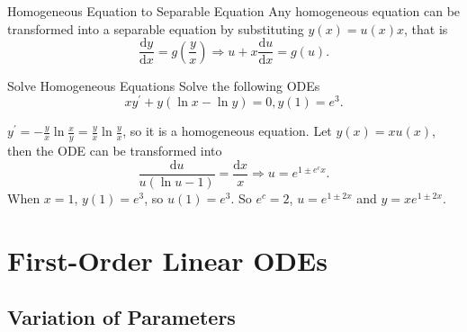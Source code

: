 \begin{proposition}{Homogeneous Equation to Separable Equation}{}
  Any homogeneous equation can be transformed into a separable equation
  by substituting $y(x) = u(x)x$, that is
  \begin{equation}
    \frac{\mathrm{d} y}{\mathrm{d} x} = g \left( \frac{y}{x} \right)
    \Rightarrow
    u + x \frac{\mathrm{d}u}{\mathrm{d} x} = g(u).
  \end{equation}
\end{proposition}

\begin{example}{Solve Homogeneous Equations}{}
  Solve the following ODEs
  \begin{equation}
    xy^{\prime} + y(\ln x - \ln y) = 0, y(1) = e^3.
  \end{equation}
\end{example}

\begin{solution}
  $y^{\prime} = - \frac{y}{x} \ln \frac{x}{y} = \frac{y}{x} \ln \frac{y}{x}$, so it is a homogeneous equation.
  Let $y(x) = x u(x)$, then the ODE can be transformed into
  \begin{equation}
    \frac{\mathrm{d} u}{u(\ln u - 1)} = \frac{\mathrm{d} x}{x}
    \Rightarrow
    u = e^{1 \pm e^c x}.
  \end{equation}
  When $x = 1$, $y(1) = e^3$, so $u(1) = e^3$. So $e^c = 2$, $u = e^{1\pm 2x}$
  and $y = x e^{1 \pm 2x}$.
\end{solution}


\section{First-Order Linear ODEs}

\subsection{Variation of Parameters}

